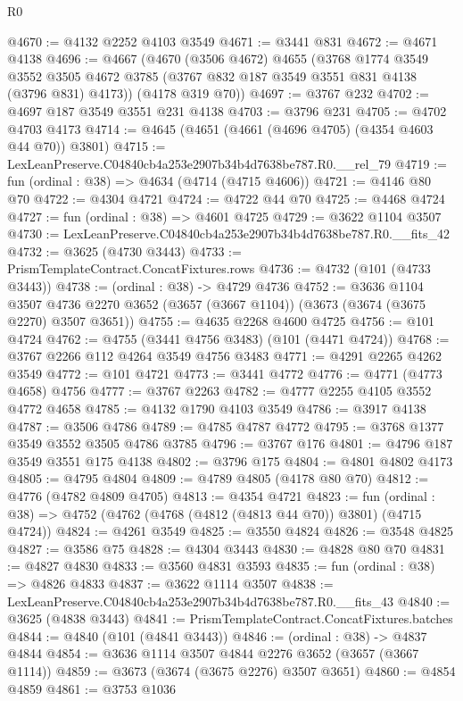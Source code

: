 \begin{lexlean}{R0}
\begin{coremodule}
@4670 := @4132 @2252 @4103 @3549
@4671 := @3441 @831
@4672 := @4671 @4138
@4696 := @4667
    (@4670
      (@3506 @4672)
      @4655
      (@3768
        @1774
        @3549
        @3552
        @3505
        @4672
        @3785
        (@3767 @832 @187 @3549 @3551 @831 @4138 (@3796 @831) @4173))
      (@4178 @319 @70))
@4697 := @3767 @232
@4702 := @4697 @187 @3549 @3551 @231 @4138
@4703 := @3796 @231
@4705 := @4702 @4703 @4173
@4714 := @4645 (@4651 (@4661 (@4696 @4705) (@4354 @4603 @44 @70)) @3801)
@4715 := LexLeanPreserve.C04840cb4a253e2907b34b4d7638be787.R0.__rel_79
@4719 := fun (ordinal : @38) => @4634 (@4714 (@4715 @4606))
@4721 := @4146 @80 @70
@4722 := @4304 @4721
@4724 := @4722 @44 @70
@4725 := @4468 @4724
@4727 := fun (ordinal : @38) => @4601 @4725
@4729 := @3622 @1104 @3507
@4730 := LexLeanPreserve.C04840cb4a253e2907b34b4d7638be787.R0.__fits_42
@4732 := @3625 (@4730 @3443)
@4733 := PrismTemplateContract.ConcatFixtures.rows
@4736 := @4732 (@101 (@4733 @3443))
@4738 := (ordinal : @38) -> @4729 @4736
@4752 := @3636
    @1104
    @3507
    @4736
    @2270
    @3652
    (@3657 (@3667 @1104))
    (@3673 (@3674 (@3675 @2270) @3507 @3651))
@4755 := @4635 @2268 @4600 @4725
@4756 := @101 @4724
@4762 := @4755 (@3441 @4756 @3483) (@101 (@4471 @4724))
@4768 := @3767 @2266 @112 @4264 @3549 @4756 @3483
@4771 := @4291 @2265 @4262 @3549
@4772 := @101 @4721
@4773 := @3441 @4772
@4776 := @4771 (@4773 @4658) @4756
@4777 := @3767 @2263
@4782 := @4777 @2255 @4105 @3552 @4772 @4658
@4785 := @4132 @1790 @4103 @3549
@4786 := @3917 @4138
@4787 := @3506 @4786
@4789 := @4785 @4787 @4772
@4795 := @3768 @1377 @3549 @3552 @3505 @4786 @3785
@4796 := @3767 @176
@4801 := @4796 @187 @3549 @3551 @175 @4138
@4802 := @3796 @175
@4804 := @4801 @4802 @4173
@4805 := @4795 @4804
@4809 := @4789 @4805 (@4178 @80 @70)
@4812 := @4776 (@4782 @4809 @4705)
@4813 := @4354 @4721
@4823 := fun (ordinal : @38) => @4752 (@4762 (@4768 (@4812 (@4813 @44 @70)) @3801) (@4715 @4724))
@4824 := @4261 @3549
@4825 := @3550 @4824
@4826 := @3548 @4825
@4827 := @3586 @75
@4828 := @4304 @3443
@4830 := @4828 @80 @70
@4831 := @4827 @4830
@4833 := @3560 @4831 @3593
@4835 := fun (ordinal : @38) => @4826 @4833
@4837 := @3622 @1114 @3507
@4838 := LexLeanPreserve.C04840cb4a253e2907b34b4d7638be787.R0.__fits_43
@4840 := @3625 (@4838 @3443)
@4841 := PrismTemplateContract.ConcatFixtures.batches
@4844 := @4840 (@101 (@4841 @3443))
@4846 := (ordinal : @38) -> @4837 @4844
@4854 := @3636 @1114 @3507 @4844 @2276 @3652 (@3657 (@3667 @1114))
@4859 := @3673 (@3674 (@3675 @2276) @3507 @3651)
@4860 := @4854 @4859
@4861 := @3753 @1036

\end{coremodule}
\end{lexlean}
